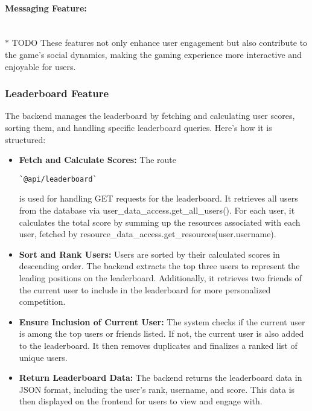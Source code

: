 \documentclass[12pt]{article}
\begin{document}
\paragraph{Messaging Feature:}
\\ $\ast$ TODO
These features not only enhance user engagement but also contribute to the game's social dynamics, making the gaming experience more interactive and enjoyable for users.
\subsubsection{Leaderboard Feature}
The backend manages the leaderboard by fetching and calculating user scores, sorting them, and handling specific leaderboard queries. Here's how it is structured:
\begin{itemize}
    \item \textbf{Fetch and Calculate Scores:} The route \begin{verbatim}`@api/leaderboard`\end{verbatim} is used for handling GET requests for the leaderboard. It retrieves all users from the database via user\_data\_access.get\_all\_users(). For each user, it calculates the total score by summing up the resources associated with each user, fetched by resource\_data\_access.get\_resources(user.username).
    \item \textbf{Sort and Rank Users:} Users are sorted by their calculated scores in descending order. The backend extracts the top three users to represent the leading positions on the leaderboard. Additionally, it retrieves two friends of the current user to include in the leaderboard for more personalized competition.
    \item \textbf{Ensure Inclusion of Current User:} The system checks if the current user is among the top users or friends listed. If not, the current user is also added to the leaderboard. It then removes duplicates and finalizes a ranked list of unique users.
    \item \textbf{Return Leaderboard Data:} The backend returns the leaderboard data in JSON format, including the user's rank, username, and score. This data is then displayed on the frontend for users to view and engage with.
\end{itemize}
\end{document}
